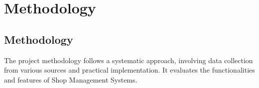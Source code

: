 \chapter{Methodology}
\section{Methodology}
The project methodology follows a systematic approach, involving data collection from various sources and practical implementation. It evaluates the functionalities and features of Shop Management Systems.



% 
% 
% 

